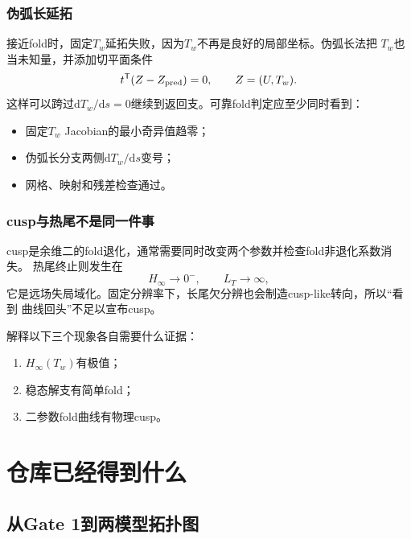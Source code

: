 \documentclass[UTF8,zihao=-4,openany]{ctexbook}
\newcommand{\dd}{\mathrm{d}}
\begin{document}
\section{伪弧长延拓}

接近fold时，固定$T_w$延拓失败，因为$T_w$不再是良好的局部坐标。伪弧长法把
$T_w$也当未知量，并添加切平面条件
\begin{equation}
 t^\mathsf{T}(Z-Z_{\rm pred})=0,
 \qquad Z=(U,T_w).
\end{equation}
这样可以跨过$\dd T_w/\dd s=0$继续到返回支。可靠fold判定应至少同时看到：

\begin{itemize}
 \item 固定$T_w$ Jacobian的最小奇异值趋零；
 \item 伪弧长分支两侧$\dd T_w/\dd s$变号；
 \item 网格、映射和残差检查通过。
\end{itemize}

\section{cusp与热尾不是同一件事}

cusp是余维二的fold退化，通常需要同时改变两个参数并检查fold非退化系数消失。
热尾终止则发生在
\begin{equation}
 H_\infty\to0^-,\qquad L_T\to\infty,
\end{equation}
它是远场失局域化。固定分辨率下，长尾欠分辨也会制造cusp-like转向，所以“看到
曲线回头”不足以宣布cusp。

\begin{checkpoint}
解释以下三个现象各自需要什么证据：
\begin{enumerate}
  \item $H_\infty(T_w)$有极值；
  \item 稳态解支有简单fold；
  \item 二参数fold曲线有物理cusp。
\end{enumerate}
\end{checkpoint}

\part{仓库已经得到什么}

\chapter{从Gate 1到两模型拓扑图}\label{ch:topology}
\end{document}
